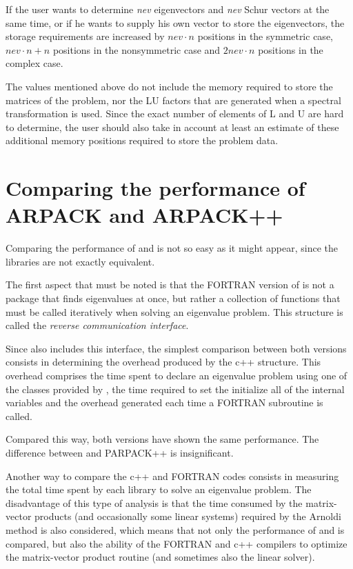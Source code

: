 If the user wants to determine \textit{nev} eigenvectors and \textit{nev} Schur vectors at the same time, or if he wants to supply his own vector to store the eigenvectors, the storage requirements are increased by $nev\cdot n$ positions in the symmetric case, $nev\cdot n + n$ positions in the nonsymmetric case and $2nev\cdot n$ positions in the complex case.

The values mentioned above do not include the memory required to store the matrices of the problem, nor the LU factors that are generated when a spectral transformation is used. Since the exact number of elements of L and U are hard to determine, the user should also take in account at least an estimate of these additional memory positions required to store the problem data.

\section{Comparing the performance of ARPACK and ARPACK++}

Comparing the performance of \ARP{} and \ARPP{} is not so easy as it might appear, since the libraries are not exactly equivalent.

The first aspect that must be noted is that the FORTRAN version of \ARP{} is not a package that finds eigenvalues at once, but rather a collection of functions that must be called iteratively when solving an eigenvalue problem. This structure is called the \textit{reverse communication interface}.

Since \ARPP{} also includes this interface, the simplest comparison between both versions consists in determining the overhead produced by the c++ structure. This overhead comprises the time spent to declare an eigenvalue problem using one of the classes provided by \ARPP{}, the time required to set the initialize all of the \ARPP{} internal variables and the overhead generated each time a FORTRAN subroutine is called.

Compared this way, both versions have shown the same performance. The difference between \ARP{} and PARPACK++ is insignificant.

Another way to compare the c++ and FORTRAN codes consists in measuring the total time spent by each library to solve an eigenvalue problem. The disadvantage of this type of analysis is that the time consumed by the matrix-vector products (and occasionally some linear systems) required by the Arnoldi method is also considered, which means that not only the performance of \ARP{} and \ARPP{} is compared, but also the ability of the FORTRAN and c++ compilers to optimize the matrix-vector product routine (and sometimes also the linear solver).

